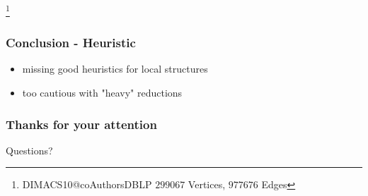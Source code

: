 \documentclass{beamer}[12pt]
\newcommand\blfootnote[1]{%
	\begingroup
	\renewcommand\thefootnote{}\footnote{#1}%
	\addtocounter{footnote}{-1}%
	\endgroup
}
\begin{document}
\begin{frame}
\blfootnote{DIMACS10@coAuthorsDBLP $299067$ Vertices, $977676$ Edges}
\end{frame}
\usebackgroundtemplate{}

\begin{frame}
\end{frame}
\begin{frame}
\frametitle{Conclusion - Heuristic}

\begin{itemize}
\item missing good heuristics for local structures
\item too cautious with "heavy" reductions
\end{itemize}
\end{frame}

	

	
%		
%		


		
	\begin{frame}
		\frametitle{Thanks for your attention}
		\centering	\Huge Questions?
	\end{frame}
\end{document}
